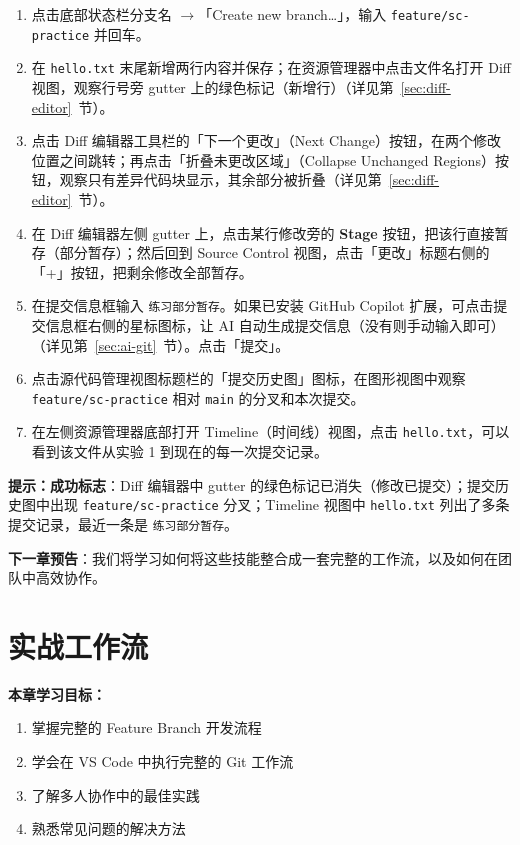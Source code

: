 \documentclass[12pt,a4paper,openany]{ctexbook}
\begin{document}
\medskip
\begin{enumerate}[leftmargin=1.5em]
  \item 点击底部状态栏分支名 $\to$「Create new branch…」，输入 \texttt{feature/sc-practice} 并回车。
  \item 在 \texttt{hello.txt} 末尾新增两行内容并保存；在资源管理器中点击文件名打开 Diff 视图，观察行号旁 gutter 上的绿色标记（新增行）（详见第~\ref{sec:diff-editor}~节）。
  \item 点击 Diff 编辑器工具栏的「下一个更改」（Next Change）按钮，在两个修改位置之间跳转；再点击「折叠未更改区域」（Collapse Unchanged Regions）按钮，观察只有差异代码块显示，其余部分被折叠（详见第~\ref{sec:diff-editor}~节）。
  \item 在 Diff 编辑器左侧 gutter 上，点击某行修改旁的 \textbf{Stage} 按钮，把该行直接暂存（部分暂存）；然后回到 Source Control 视图，点击「更改」标题右侧的「+」按钮，把剩余修改全部暂存。
  \item 在提交信息框输入 \texttt{练习部分暂存}。如果已安装 GitHub Copilot 扩展，可点击提交信息框右侧的星标图标，让 AI 自动生成提交信息（没有则手动输入即可）（详见第~\ref{sec:ai-git}~节）。点击「提交」。
  \item 点击源代码管理视图标题栏的「提交历史图」图标，在图形视图中观察 \texttt{feature/sc-practice} 相对 \texttt{main} 的分叉和本次提交。
  \item 在左侧资源管理器底部打开 Timeline（时间线）视图，点击 \texttt{hello.txt}，可以看到该文件从实验 1 到现在的每一次提交记录。
\end{enumerate}
\medskip

\noindent\textbf{提示：}\textbf{成功标志}：Diff 编辑器中 gutter 的绿色标记已消失（修改已提交）；提交历史图中出现 \texttt{feature/sc-practice} 分叉；Timeline 视图中 \texttt{hello.txt} 列出了多条提交记录，最近一条是 \texttt{练习部分暂存}。
\medskip

\textbf{下一章预告}：我们将学习如何将这些技能整合成一套完整的工作流，以及如何在团队中高效协作。

\chapter{实战工作流}

\medskip
\noindent\textbf{本章学习目标：}
\begin{enumerate}[leftmargin=1.5em]
  \item 掌握完整的 Feature Branch 开发流程
  \item 学会在 VS Code 中执行完整的 Git 工作流
  \item 了解多人协作中的最佳实践
  \item 熟悉常见问题的解决方法
\end{enumerate}
\medskip
\end{document}
